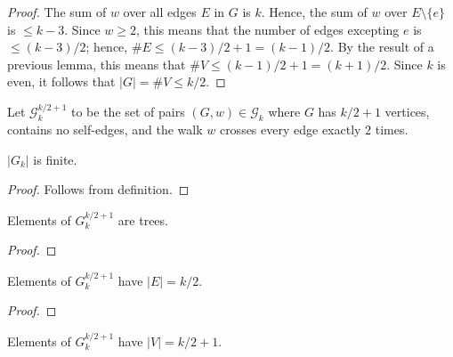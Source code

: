 \begin{proof}
  \notready
  The sum of $w$ over all edges $E$ in $G$ is $k$.  Hence, the sum of $w$ over $E\setminus\{e\}$ is $\le k-3$.  Since $w\ge 2$, this means that the number of edges excepting $e$ is $\le (k-3)/2$; hence, $\#E \le (k-3)/2+1 = (k-1)/2$.  By the result of a previous lemma, this means that $\#V \le (k-1)/2+1 = (k+1)/2$.  Since $k$ is even, it follows that $|G|=\#V \le k/2$.
\end{proof}




\begin{definition}
  \label{def:special_set_g}
  \notready
  Let $\mathcal{G}^{k/2+1}_k$ to be the set of pairs $(G,w)\in\mathcal{G}_k$ where $G$ has $k/2+1$ vertices, contains no self-edges, and the walk $w$ crosses every edge exactly $2$ times.
\end{definition}


\begin{lemma}
  \label{lem:graph_set_finite}
  \notready
  $|G_k|$ is finite.
\end{lemma}

\begin{proof}
  \notready
  Follows from definition.
\end{proof}


\begin{lemma}
  \label{lem:special_g_tree}
  \notready
  Elements of $G_k^{k/2+1}$ are trees.
\end{lemma}

\begin{proof}
  \notready
\end{proof}

\begin{lemma}
  \label{lem:special_g_edge_count}
  \notready
  Elements of $G_k^{k/2+1}$ have $|E| = k/2$.
\end{lemma}

\begin{proof}
  \notready
\end{proof}

\iffalse
\begin{lemma}
  \label{lem:special_g_vertex_count}
  \notready
  Elements of $G_k^{k/2+1}$ have $|V| = k/2 + 1$.
\end{lemma}

